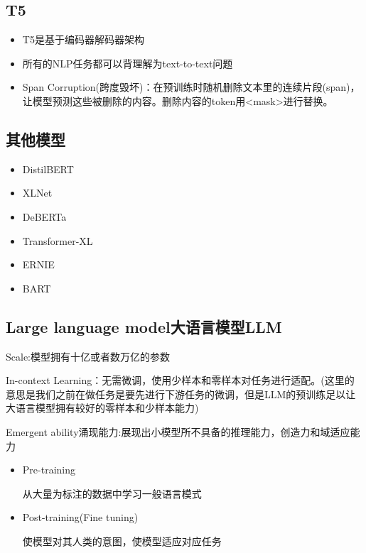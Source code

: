 \documentclass[UTF8]{ctexart}
\begin{document}
\subsection{T5}
\begin{itemize}
    \item T5是基于编码器解码器架构
    \item 所有的NLP任务都可以背理解为text-to-text问题
    \item Span Corruption(跨度毁坏)：在预训练时随机删除文本里的连续片段(span)，让模型预测这些被删除的内容。删除内容的token用<mask>进行替换。
\end{itemize}

\subsection{其他模型}
\begin{itemize}
    \item DistilBERT
    \item XLNet
    \item DeBERTa
    \item Transformer-XL
    \item ERNIE
    \item BART
\end{itemize}

\subsection{Large language model大语言模型LLM}

Scale:模型拥有十亿或者数万亿的参数

In-context Learning：无需微调，使用少样本和零样本对任务进行适配。(这里的意思是我们之前在做任务是要先进行下游任务的微调，但是LLM的预训练足以让大语言模型拥有较好的零样本和少样本能力)

Emergent ability涌现能力:展现出小模型所不具备的推理能力，创造力和域适应能力

\begin{itemize}
    \item Pre-training
    
    从大量为标注的数据中学习一般语言模式

    \item Post-training(Fine tuning)
    
    使模型对其人类的意图，使模型适应对应任务
\end{itemize}
\end{document}
